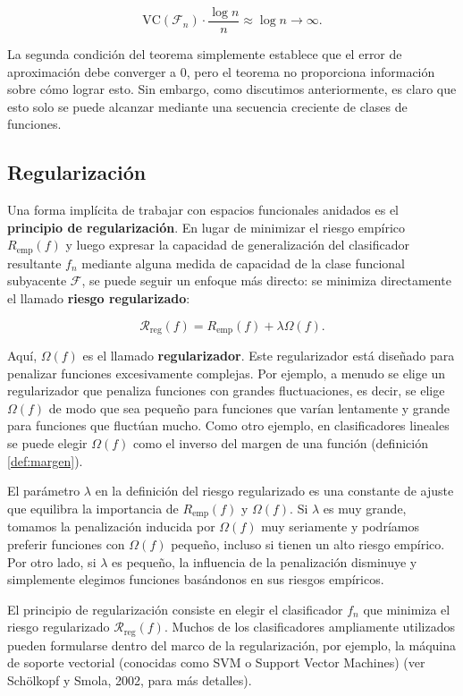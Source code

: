 \documentclass{report}
\begin{document}
\[
\text{VC}(\mathcal{F}_n) \cdot \frac{\log n}{n} \approx \log n \to \infty.
\]

La segunda condición del teorema simplemente establece que el error de aproximación debe converger a \(0\), pero 
el teorema no proporciona información sobre cómo lograr esto. Sin embargo, como discutimos anteriormente, es claro 
que esto solo se puede alcanzar mediante una secuencia creciente de clases de funciones.\newline

\subsection{Regularización}

Una forma implícita de trabajar con espacios funcionales anidados es el \textbf{principio de regularización}. 
En lugar de minimizar el riesgo empírico \(R_{\text{emp}}(f)\) y luego expresar la capacidad de generalización 
del clasificador resultante \(f_n\) mediante alguna medida de capacidad de la clase funcional subyacente 
\(\mathcal{F}\), se puede seguir un enfoque más directo: se minimiza directamente el llamado \textbf{riesgo 
regularizado}:

\[
\mathcal{R}_{\text{reg}}(f) = R_{\text{emp}}(f) + \lambda \Omega(f).
\]

Aquí, \(\Omega(f)\) es el llamado \textbf{regularizador}. Este regularizador está diseñado para penalizar 
funciones excesivamente complejas. Por ejemplo, a menudo se elige un regularizador que penaliza funciones con 
grandes fluctuaciones, es decir, se elige \(\Omega(f)\) de modo que sea pequeño para funciones que varían 
lentamente y grande para funciones que fluctúan mucho. Como otro ejemplo, en clasificadores lineales se puede 
elegir \(\Omega(f)\) como el inverso del margen de una función (definición \ref{def:margen}).\newline

El parámetro \(\lambda\) en la definición del riesgo regularizado es una constante de ajuste que equilibra la 
importancia de \(R_{\text{emp}}(f)\) y \(\Omega(f)\). Si \(\lambda\) es muy grande, tomamos la penalización 
inducida por \(\Omega(f)\) muy seriamente y podríamos preferir funciones con \(\Omega(f)\) pequeño, incluso si 
tienen un alto riesgo empírico. Por otro lado, si \(\lambda\) es pequeño, la influencia de la penalización 
disminuye y simplemente elegimos funciones basándonos en sus riesgos empíricos.\newline

El principio de regularización consiste en elegir el clasificador \(f_n\) que minimiza el riesgo regularizado 
\(\mathcal{R}_{\text{reg}}(f)\). Muchos de los clasificadores ampliamente utilizados pueden formularse dentro 
del marco de la regularización, por ejemplo, la máquina de soporte vectorial (conocidas como SVM o Support Vector Machines)
(ver Schölkopf y Smola, 2002, 
para más detalles).\newline
\end{document}
